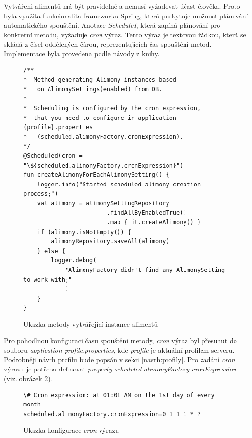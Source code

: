             Vytvářeni alimentů má být pravidelné a nemusí vyžadovat účast člověka. Proto byla využita funkcionalita frameworku Spring, která poskytuje možnost plánování automatického spouštěni. \cite{spring-scheduling}Anotace \textit{Scheduled}, která zapíná plánování pro konkretní metodu, vyžaduje \textit{cron} výraz. Tento výraz je textovou řádkou, která se skládá z čísel oddělených čárou, reprezentujících čas spouštění metod\cite{cron-expression}. Implementace byla provedena podle návody z knihy\cite{sbr:spring-task-scheduling}.
            \begin{figure}
                \begin{verbatim}
/**
*  Method generating Alimony instances based 
*   on AlimonySettings(enabled) from DB.
*
*  Scheduling is configured by the cron expression,
*  that you need to configure in application-{profile}.properties 
*   (scheduled.alimonyFactory.cronExpression).
*/
@Scheduled(cron = "\${scheduled.alimonyFactory.cronExpression}")
fun createAlimonyForEachAlimonySetting() {
    logger.info("Started scheduled alimony creation process;")
    val alimony = alimonySettingRepository
                        .findAllByEnabledTrue()
                        .map { it.createAlimony() }
    if (alimony.isNotEmpty()) {
        alimonyRepository.saveAll(alimony)
    } else {
        logger.debug(
            "AlimonyFactory didn't find any AlimonySetting to work with;"
            )
    }
}
                \end{verbatim}
                \caption{Ukázka metody vytvářející instance alimentů} 
                \label{code:create-alimony}
            \end{figure}
            
            Pro pohodlnou konfiguraci času spouštěni metody, \textit{cron} výraz byl přesunut do souboru \textit{application-{profile}.properties}, kde \textit{profile} je aktuální profilem serveru. Podrobněji návrh profilu bude popsán v sekci \ref{navrh:profily}. Pro zadání \textit{cron} výrazu je potřeba definovat \textit{property} \textit{scheduled.alimonyFactory.cronExpression} (viz. obrázek \ref{code:cron-expression}).  
            \begin{figure}
                \begin{verbatim}
\# Cron expression: at 01:01 AM on the 1st day of every month
scheduled.alimonyFactory.cronExpression=0 1 1 1 * ?
                \end{verbatim}
                \caption{Ukázka konfigurace \textit{cron} výrazu} 
                \label{code:cron-expression}
            \end{figure}
            
